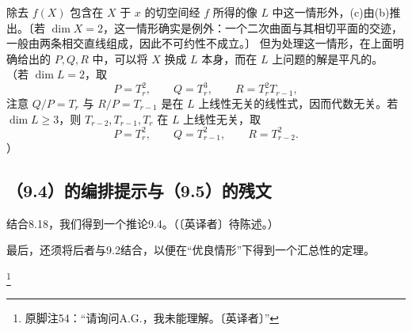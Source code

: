 除去 $f(X)$ 包含在 $X$ 于 $x$ 的切空间经 $f$ 所得的像 $L$ 中这一情形外，(c)由(b)推出。〔若 $\dim X=2$，这一情形确实是例外：一个二次曲面与其相切平面的交迹，一般由两条相交直线组成，因此不可约性不成立。〕
但为处理这一情形，在上面明确给出的 $P,Q,R$ 中，可以将 $X$ 换成 $L$ 本身，而在 $L$ 上问题的解是平凡的。
（若 $\dim L=2$，取
\[
P=T_r^2,\qquad Q=T_r^3,\qquad R=T_r^2T_{r-1},
\]
注意 $Q/P=T_r$ 与 $R/P=T_{r-1}$ 是在 $L$ 上线性无关的线性式，因而代数无关。若 $\dim L\ge3$，则 $T_{r-2},T_{r-1},T_r$ 在 $L$ 上线性无关，取
\[
P=T_r^2,\qquad Q=T_{r-1}^2,\qquad R=T_{r-2}^2.
\]
）

\subsection*{（9.4）的编排提示与（9.5）的残文}
结合8.18，我们得到一个推论9.4。（〔英译者〕待陈述。）

最后，还须将后者与9.2结合，以便在“优良情形”下得到一个汇总性的定理。

\footnote{原脚注54：“请询问A.G.，我未能理解。〔英译者〕”}

